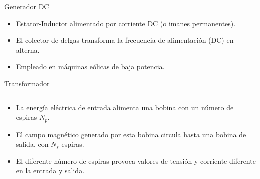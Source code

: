 \documentclass[xcolor={usenames,svgnames,dvipsnames}]{beamer}
\begin{document}
\begin{frame}[label={sec:org0145af6}]{Generador DC}
\begin{itemize}
\item Estator-Inductor alimentado por corriente DC (o imanes permanentes).

\item El colector de delgas transforma la frecuencia de alimentación (DC)
en alterna.

\item Empleado en máquinas eólicas de baja potencia.
\end{itemize}
\end{frame}


\begin{frame}[label={sec:orgdee8163}]{Transformador}
\begin{columns}
\begin{column}{0.6\columnwidth}
\begin{itemize}
\item La energía eléctrica de entrada alimenta una bobina con un número de espiras \(N_p\).
\item El campo magnético generado por esta bobina circula hasta una bobina de salida, con \(N_s\) espiras.
\item El diferente número de espiras provoca valores de tensión y corriente diferente en la entrada y salida.
\end{itemize}
\end{column}


\end{columns}
\end{frame}
\end{document}

